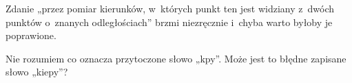 \documentclass[a4paper,11pt]{article}
\begin{document}
\vspace{\spaceFour}


\start {} Zdanie „przez pomiar kierunków, w~których punkt
ten jest widziany z~dwóch punktów o~znanych odległościach” brzmi
niezręcznie i~chyba warto byłoby je poprawione.

\vspace{\spaceFour}


\start {} Nie rozumiem co oznacza przytoczone słowo
„kpy”. Może jest to błędne zapisane słowo „kiepy”?

\vspace{\spaceFour}








\end{document}

